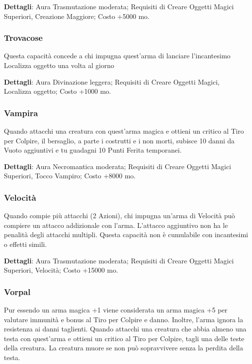 \begin{multicols}{2}
	\textbf{Dettagli}: Aura Trasmutazione moderata; Requisiti di Creare Oggetti Magici Superiori, Creazione Maggiore; Costo +5000 mo.

	\subsubsection*{Trovacose}
	Questa capacità concede a chi impugna quest'arma di lanciare l'incantesimo Localizza oggetto una volta al giorno

	\textbf{Dettagli}: Aura Divinazione leggera; Requisiti di Creare Oggetti Magici, Localizza oggetto; Costo +1000 mo.

	\subsubsection*{Vampira}

	Quando attacchi una creatura con quest'arma magica e ottieni un critico al Tiro per Colpire, il bersaglio, a parte i costrutti e i non morti, subisce 10 danni da Vuoto aggiuntivi e tu guadagni 10 Punti Ferita temporanei.

	\textbf{Dettagli}: Aura Necromantica moderata; Requisiti di Creare Oggetti Magici Superiori, Tocco Vampiro; Costo +8000 mo.

	\subsubsection*{Velocità}

	Quando compie più attacchi (2 Azioni), chi impugna un'arma di Velocità può compiere un attacco addizionale con l'arma. L'attacco aggiuntivo non ha le penalità degli attacchi multipli. Questa capacità non è cumulabile con incantesimi o effetti simili.

	\textbf{Dettagli}: Aura Trasmutazione moderata; Requisiti di Creare Oggetti Magici Superiori, Velocità; Costo +15000 mo.

	\subsubsection*{Vorpal}

	Pur essendo un arma magica +1 viene considerata un arma magica +5 per valutare immunità e bonus al Tiro per Colpire e danno. Inoltre, l'arma ignora la resistenza ai danni taglienti. Quando attacchi una creatura che abbia almeno una testa con quest'arma e ottieni un critico al Tiro per Colpire, tagli una delle teste della creatura. La creatura muore se non può sopravvivere senza la perdita della testa.


\end{multicols}
